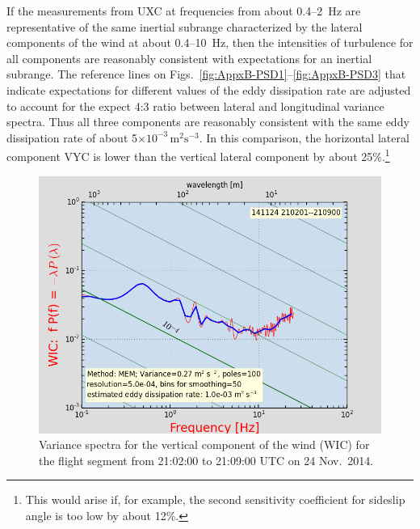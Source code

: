 \documentclass[12pt,twoside,english]{article}\usepackage[]{graphicx}\usepackage[]{color}
\let\OrgIndex\index
\renewcommand*{\index}[1]{\OrgIndex{#1}}
\begin{document}
If the measurements from UXC at frequencies from about 0.4--2~Hz are representative of the same inertial subrange characterized by the lateral components of the wind at about 0.4--10~Hz, then the intensities of turbulence for all components are reasonably consistent with expectations for an inertial subrange. The reference lines on Figs.~\ref{fig:AppxB-PSD1}--\ref{fig:AppxB-PSD3} that indicate expectations for different values of the eddy dissipation rate are adjusted to account for the expect 4:3 ratio between lateral and longitudinal variance spectra. Thus all three components are reasonably consistent with the same eddy dissipation rate of about 5$\times10^{-3}\,\mathrm{m}^{2}\mathrm{s}^{-3}$. In this comparison, the horizontal lateral component VYC is lower than the vertical lateral component by about 25\%.\footnote{This would arise if, for example, the second sensitivity coefficient for sideslip angle is too low by about 12\%.}





\begin{figure}
\noindent \begin{centering}
\includegraphics[height=0.4\textheight]{SpecialGraphics/PSD5.png}  
\par\end{centering}

\protect\protect\protect\caption{\label{fig:AppxB-PSD5}Variance spectra for the vertical component of the wind (WIC) for the flight segment from 21:02:00 to 21:09:00 UTC on 24 Nov.\ 2014.} 
\end{figure}
\end{document}
